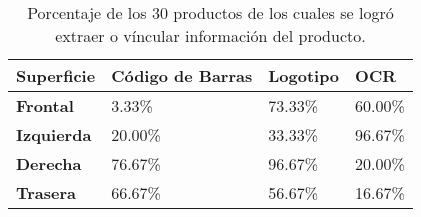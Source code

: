 \begin{table}
\caption{Porcentaje de los 30 productos de los cuales se logró extraer o víncular información del producto.}
\label{table:porcentajeDeImagenesProcesadas}
    \begin{tabular}{ | m{2.5cm} | m{2.5cm} | m{2.5cm} | m{2.5cm} |}
    \hline 
    \textbf{Superficie}   & \textbf{Código de Barras} & \textbf{Logotipo} & \textbf{OCR} \\ \hline
\textbf{Frontal}   & 3.33\% & 73.33\% & 60.00\% \\ \hline 
\textbf{Izquierda}   & 20.00\% & 33.33\% & 96.67\% \\ \hline 
\textbf{Derecha}   & 76.67\% & 96.67\% & 20.00\% \\ \hline 
\textbf{Trasera}   & 66.67\% & 56.67\% & 16.67\% \\ \hline 

    \end{tabular}
\end{table}
